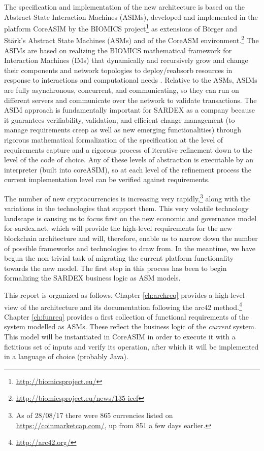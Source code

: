 The specification and implementation of the new architecture is based on the Abstract State Interaction Machines (ASIMs), developed and implemented in the platform CoreASIM by the BIOMICS project\footnote{\url{http://biomicsproject.eu/}} \cite{BIOMICSD41,BIOMICSD42,BIOMICSD52} as extensions of B\"orger and St\"ark's \cite{BoergerStaerk2003} Abstract State Machines (ASMs) and of the CoreASM environment.\footnote{\url{http://biomicsproject.eu/news/135-icef}} The ASIMs are based on realizing the BIOMICS mathematical framework for Interaction Machines (IMs) that dynamically and recursively grow and change their components and network topologies to deploy/reabsorb resources in response to interactions and computational needs \cite{NehanivEtAl2015}. Relative to the ASMs, ASIMs are fully asynchronous, concurrent, and communicating, so they can run on different servers and communicate over the network to validate transactions. The ASIM approach is fundamentally important for SARDEX as a company because it guarantees verifiability, validation, and efficient change management (to manage requirements creep as well as new emerging functionalities) through rigorous mathematical formalization of the specification at the level of requirements capture and a rigorous process of iterative refinement down to the level of the code of choice. Any of these levels of abstraction is executable by an interpreter (built into coreASIM), so at each level of the refinement process the current implementation level can be verified against requirements.

The number of new cryptocurrencies is increasing very rapidly,\footnote{As of 28/08/17 there were 865 currencies listed on \url{https://coinmarketcap.com/}, up from 851 a few days earlier.} along with the variations in the technologies that support them. This very volatile technology landscape is causing us to focus first on the new economic and governance model for sardex.net, which will provide the high-level requirements for the new blockchain architecture and will, therefore, enable us to narrow down the number of possible frameworks and technologies to draw from. In the meantime, we have begun the non-trivial task of migrating the current platform functionality towards the new model. The first step in this process has been to begin formalizing the SARDEX business logic as ASM models.

This report is organized as follows. Chapter \ref{ch:archreq} provides a high-level view of the architecture and its documentation following the arc42 method.\footnote{\url{http://arc42.org/}} Chapter \ref{ch:funreq} provides a first collection of functional requirements of the system modelled as ASMs. These reflect the business logic of the \emph{current} system. This model will be instantiated in CoreASIM in order to execute it with a fictitious set of inputs and verify its operation, after which it will be implemented in a language of choice (probably Java).

